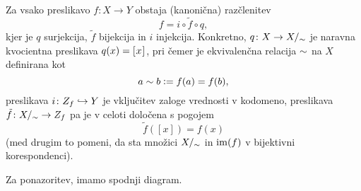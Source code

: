                 \begin{izrek}
                        Za vsako preslikavo $f\colon X \to Y$ obstaja (kanonična) razčlenitev
                        \[f = i \circ \tilde{f} \circ q,\]
                        kjer je $q$ surjekcija, $\tilde{f}$ bijekcija in $i$ injekcija. Konkretno, $q\colon X \to X/_\sim$ je naravna kvocientna preslikava $q(x) = [\:\!{x}\:\!]_{}$, pri čemer je ekvivalenčna relacija $\sim$ na $X$ definirana kot
                        \[a \sim b \mathrel{\mathop:}= f(a) = f(b),\]
                        preslikava $i\colon Z_{f} \hookrightarrow Y$ je vključitev zaloge vrednosti v kodomeno, preslikava $\tilde{f}\colon X/_\sim \to Z_{f}$ pa je v celoti določena s pogojem
                        \[\tilde{f}([x]) = f(x)\]
                        (med drugim to pomeni, da sta množici $X/_\sim$ in $\mathrm{im}(f)$ v bijektivni korespondenci). 

                        Za ponazoritev, imamo spodnji diagram.

                \end{izrek}

                \begin{dokaz}
                \end{dokaz}